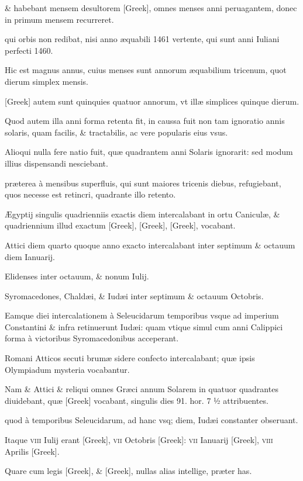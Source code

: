 \& habebant mensem desultorem
\textgreek{[Greek]}, omnes menses anni peruagantem, donec in primum
mensem recurreret.

qui orbis non redibat, nisi anno æquabili 1461
vertente, qui sunt anni Iuliani perfecti 1460.

Hic est magnus annus,
cuius menses sunt annorum æquabilium tricenum, quot dierum simplex
mensis.

\textgreek{[Greek]} autem sunt quinquies quatuor annorum, vt
illæ simplices quinque dierum.

Quod autem illa anni forma retenta
fit, in caussa fuit non tam ignoratio annis solaris,
 quam facilis, \& tractabilis, ac vere popularis eius vsus.

Alioqui nulla fere natio fuit, quæ
quadrantem anni Solaris ignorarit: sed modum illius dispensandi
nesciebant.

præterea à mensibus superfluis, qui sunt maiores tricenis
diebus, refugiebant, quos necesse est retincri,
 quadrante illo retento.

Ægyptij singulis quadrienniis exactis diem intercalabant in ortu Caniculæ,
\& quadriennium illud exactum \textgreek{[Greek]}, \textgreek{[Greek]},
\textgreek{[Greek]}, vocabant.

Attici diem quarto quoque anno exacto intercalabant
inter septimum \& octauum diem Ianuarij.

Elidenses inter
octauum, \& nonum Iulij.

Syromacedones, Chaldæi, \& Iudæi inter
septimum \& octauum Octobris.

Eamque diei intercalationem à Seleucidarum
temporibus vsque ad imperium Constantini \& infra retinuerunt
Iudæi: quam vtique simul cum anni Calippici forma à victoribus
Syromacedonibus acceperant.

Romani Atticos secuti brumæ
sidere confecto intercalabant; quæ ipsis Olympiadum mysteria vocabantur.

Nam \& Attici \& reliqui omnes Græci annum Solarem in
quatuor quadrantes diuidebant, quæ \textgreek{[Greek]}
 vocabant, singulis dies 91.
hor. 7 ½ attribuentes.

quod à temporibus Seleucidarum, ad hanc vsq;
diem, Iudæi constanter obseruant.

Itaque \textsc{viii} Iulij erant \textgreek{[Greek]},
\textsc{vii} Octobris \textgreek{[Greek]}:
 \textsc{vii} Ianuarij \textgreek{[Greek]}, \textsc{viii}
Aprilis \textgreek{[Greek]}.

Quare cum legis \textgreek{[Greek]}, \& \textgreek{[Greek]},
nullas alias intellige, præter has.

